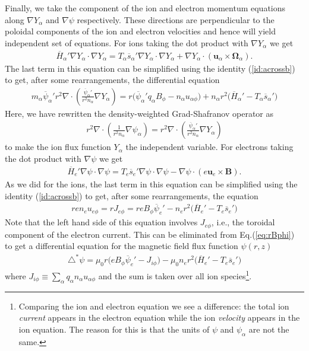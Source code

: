 \documentclass[11pt, reqno]{amsart}
\newcommand{\eqr}[1]{Eq.\thinspace(#1)}
\newcommand{\mvec}[1]{\mathbf{#1}}
\theoremstyle{definition}
\begin{document}
Finally, we take the component of the ion and electron momentum
equations along $\nabla Y_\alpha$ and $\nabla \psi$
respectively. These directions are perpendicular to the poloidal
components of the ion and electron velocities and hence will yield
independent set of equations. For ions taking the dot product with
$\nabla Y_\alpha$ we get
\begin{align}
  \overline{H}_\alpha' \nabla Y_\alpha \cdot \nabla Y_\alpha
  = T_\alpha \overline{s}_\alpha' \nabla Y_\alpha \cdot \nabla Y_\alpha
  +
  \nabla Y_\alpha \cdot (\mvec{u}_\alpha\times\mvec{\Omega}_\alpha).
\end{align}
The last term in this equation can be simplified using the identity
(\ref{id:acrossb}) to get, after some rearrangements, the differential
equation
\begin{align}
  m_\alpha\overline{\psi}_\alpha' 
  r^2\nabla\cdot
  \left(
    \frac{\overline{\psi}_\alpha'}{r^2 n_\alpha}\nabla Y_\alpha
  \right)
  =
  r\big(
  \overline{\psi}_\alpha' q_\alpha  B_\phi - n_\alpha u_{\alpha\phi}
  \big)
  + n_\alpha r^2 \big(
  \overline{H}_\alpha' - T_\alpha \overline{s}_\alpha'
  \big)
\end{align}
Here, we have rewritten the density-weighted Grad-Shafranov operator
as
\begin{align}
  r^2\nabla\cdot\left(\frac{1}{r^2 n_\alpha}\nabla\psi_\alpha\right)
  =
  r^2\nabla\cdot
  \left(
    \frac{\overline{\psi}_\alpha'}{r^2 n_\alpha}\nabla Y_\alpha
  \right)
\end{align}
to make the ion flux function $Y_\alpha$ the independent variable. For
electrons taking the dot product with $\nabla \psi$ we get
\begin{align}
  \overline{H}_e' \nabla \psi \cdot \nabla \psi
  = T_e \overline{s}_e' \nabla \psi \cdot \nabla \psi
  -
  \nabla \psi \cdot ( e \mvec{u}_e\times\mvec{B}).
\end{align}
As we did for the ions, the last term in this equation can be
simplified using the identity (\ref{id:acrossb}) to get, after some
rearrangements, the equation
\begin{align}
  r en_e u_{e\phi} = r J_{e\phi} =
  reB_\phi\overline{\psi}_e'
  -
  n_e r^2
  \big(
  \overline{H}_e' - T_e \overline{s}_e'  
  \big)
\end{align}
Note that the left hand side of this equation involves $J_{e\phi}$,
i.e., the toroidal component of the electron current. This can be
eliminated from \eqr{\ref{eq:rBphi}} to get a differential equation
for the magnetic field flux function $\psi(r,z)$
\begin{align}
  \triangle^*\psi
  =
  \mu_0 r 
  \big(
  e B_\phi \overline{\psi}_e' - J_{i\phi}
  \big)
  -
  \mu_0 n_e r^2
  \big(
  \overline{H}_e' - T_e \overline{s}_e'
  \big)
\end{align}
where $J_{i\phi} \equiv \sum_\alpha q_\alpha n_\alpha u_{\alpha\phi}$
and the sum is taken over all ion species\footnote{Comparing the ion
  and electron equation we see a difference: the total ion
  \emph{current} appears in the electron equation while the ion
  \emph{velocity} appears in the ion equation. The reason for this is
  that the units of $\psi$ and $\psi_\alpha$ are not the same.}.
\end{document}
